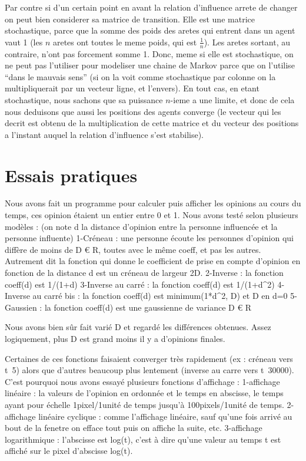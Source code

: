﻿\documentclass[a4paper,10pt]{report}
\begin{document}
Par contre si d'un certain point en avant la relation d'influence arrete de changer on peut bien considerer sa matrice de transition. Elle est une matrice stochastique, parce que la somme des poids des aretes qui entrent dans un agent vaut 1 (les $n$ aretes ont toutes le meme poids, qui est $\frac{1}{n}$). Les aretes sortant, au contraire, n'ont pas forcement somme 1. Donc, meme si elle est stochastique, on ne peut pas l'utiliser pour modeliser une chaine de Markov parce que on l'utilise ``dans le mauvais sens'' (si on la voit comme stochastique par colonne on la multipliquerait par un vecteur ligne, et l'envers). En tout cas, en etant stochastique, nous sachons que sa puissance $n$-ieme a une limite, et donc de cela nous deduisons que aussi les positions des agents converge (le vecteur qui les decrit est obtenu de la multiplication de cette matrice et du vecteur des positions a l'instant auquel la relation d'influence s'est stabilise).

\section{Essais pratiques}

Nous avons fait un programme pour calculer puis afficher les opinions au cours du temps, ces opinion étaient un entier entre 0 et 1. Nous avons testé selon plusieurs modèles : (on note d la distance d'opinion entre la personne influencée et la personne influente)
1-Créneau : une personne écoute les personnes d'opinion qui diffère de moins de D € R, toutes avec le même coeff, et pas les autres. Autrement dit la fonction qui donne le coefficient de prise en compte d'opinion en fonction de la distance d est un créneau de largeur 2D.
2-Inverse : la fonction coeff(d) est 1/(1+d)
3-Inverse au carré : la fonction coeff(d) est 1/(1+d^2)
4-Inverse au carré bis : la fonction coeff(d) est minimum(1*d^2, D) et D en d=0
5-Gaussien : la fonction coeff(d) est une gaussienne de variance D € R

Nous avons bien sûr fait varié D et regardé les différences obtenues. Assez logiquement, plus D est grand moins il y a d'opinions finales.

Certaines de ces fonctions faisaient converger très rapidement (ex : créneau vers t~5) alors que d'autres beaucoup plus lentement (inverse au carre vers t~30000). C'est pourquoi nous avons essayé plusieurs fonctions d'affichage :
1-affichage linéaire : la valeurs de l'opinion en ordonnée et le temps en abscisse, le temps ayant pour échelle 1pixel/1unité de temps jusqu'à 100pixels/1unité de temps.
2-affichage linéaire cyclique : comme l'affichage linéaire, sauf qu'une fois arrivé au bout de la fenetre on efface tout puis on affiche la suite, etc.
3-affichage logarithmique : l'abscisse est log(t), c'est à dire qu'une valeur au temps t est affiché sur le pixel d'abscisse log(t).
\end{document}
